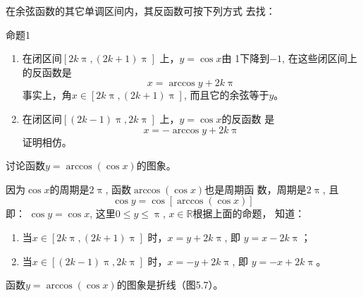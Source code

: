 在余弦函数的其它单调区间内，其反函数可按下列方式
去找：

\begin{blk}{命题1}
\begin{enumerate}
    \item 在闭区间$[2k\uppi ,(2k+1)\uppi]$ 上，$y=\cos x$由
    1下降到$-1$, 在这些闭区间上的反函数是
 \[   x=\arccos y+2k\uppi \]
    事实上，角$x\in [2k\uppi ,(2k+1)\uppi]$, 而且它的余弦等于$y$。
    \item 在闭区间$[(2k-1)\uppi ,2k\uppi]$ 上，$y=\cos x$的反函数
    是
\[    x=-\arccos y+2k\uppi \]
    证明相仿。
\end{enumerate}
\end{blk}

\begin{example}
    讨论函数$y=\arccos(\cos x)$的图象。
\end{example}

\begin{solution}
因为$\cos x$的周期是$2\uppi$, 函数$\arccos(\cos x)$也是周期函
数，周期是$2\uppi$, 且
\[\cos y=\cos[\arccos(\cos x)]\]
即：
$\cos y=\cos x$, 这里$0\leqslant y\leqslant \uppi$, $x\in\mathbb{R}$根据上面的命题，
知道：
\begin{enumerate}
    \item 当$x\in[2k\uppi ,(2k+1)\uppi]$ 时，$x=y+2k\uppi$, 即
$y=x-2k\uppi$；
\item  当$x\in[(2k-1)\uppi ,2k\uppi]$ 时，$x=-y+2k\uppi$, 即
$y=-x+2k\uppi$。
\end{enumerate}
函数$y=\arccos(\cos x)$的图象是折线（图5.7）。

\begin{figure}[htp]
    \centering
{}    
    \caption{}
\end{figure}
\end{solution}


